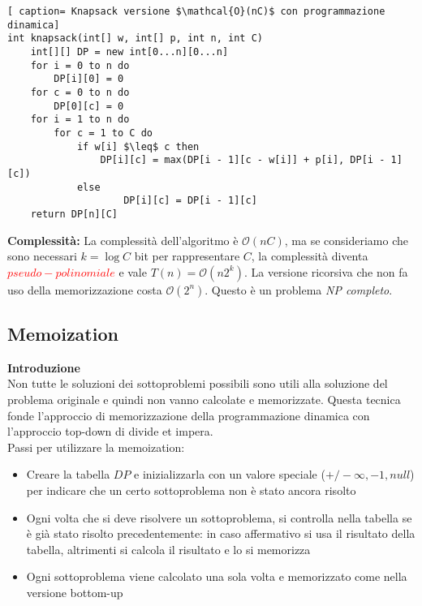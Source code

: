 \documentclass[../cheatSheetAlgoritmi.tex]{subfiles}
\begin{document}
\begin{lstlisting}[ caption= Knapsack versione $\mathcal{O}(nC)$ con programmazione dinamica]
int knapsack(int[] w, int[] p, int n, int C)
	int[][] DP = new int[0...n][0...n]
	for i = 0 to n do
		DP[i][0] = 0
	for c = 0 to n do
		DP[0][c] = 0
	for i = 1 to n do
		for c = 1 to C do
			if w[i] $\leq$ c then
				DP[i][c] = max(DP[i - 1][c - w[i]] + p[i], DP[i - 1][c])
			else
					DP[i][c] = DP[i - 1][c]
	return DP[n][C]
\end{lstlisting}
\textbf{Complessità:} La complessità dell'algoritmo è $\mathcal{O}(nC)$, ma se consideriamo che sono necessari $k = \log C$ bit per rappresentare $C$, la complessità diventa \textcolor{red}{$pseudo-polinomiale$} e vale $T(n) = \mathcal{O}(n2^{k})$.
La versione ricorsiva che non fa uso della memorizzazione costa $\mathcal{O}(2^{n})$. Questo è un problema \emph{NP completo}.
\subsection{Memoization}
\textbf{Introduzione}\\
Non tutte le soluzioni dei sottoproblemi possibili sono utili alla soluzione del problema originale e quindi non vanno calcolate e memorizzate. Questa tecnica fonde l'approccio di memorizzazione della programmazione dinamica con l'approccio top-down di divide et impera.\\
Passi per utilizzare la memoization:
\begin{itemize}
	\item Creare la tabella $DP$ e inizializzarla con un valore speciale ($+/- \infty, -1, null$) per indicare che un certo sottoproblema non è stato ancora risolto 
	\item Ogni volta che si deve risolvere un sottoproblema, si controlla nella tabella se è già stato risolto precedentemente: in caso affermativo si usa il risultato della tabella, altrimenti si calcola il risultato e lo si memorizza
	\item Ogni sottoproblema viene calcolato una sola volta e memorizzato come nella versione bottom-up
\end{itemize}
\newpage
\end{document}
